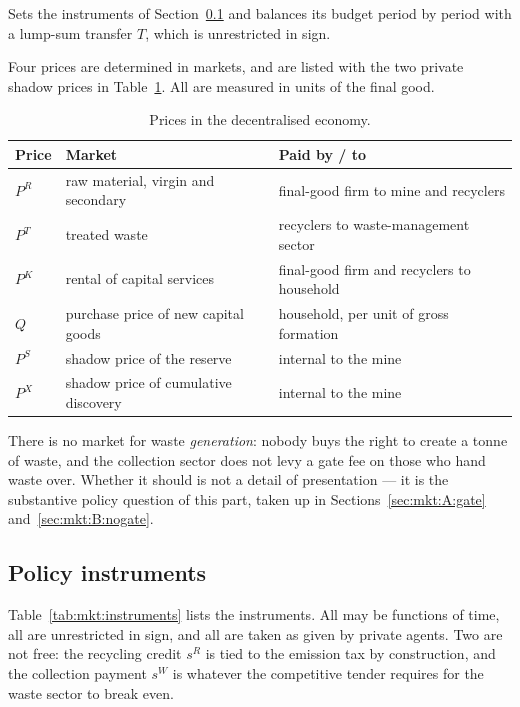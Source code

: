  Sets the instruments of Section~\ref{sec:mkt:setup:instruments} and
balances its budget period by period with a lump-sum transfer $T$, which is unrestricted in sign.

Four prices are determined in markets, and are listed with the two private shadow prices in
Table~\ref{tab:mkt:prices}. All are measured in units of the final good.

\begin{table}[H]
\centering
\caption{Prices in the decentralised economy.}
\label{tab:mkt:prices}
\setlength{\tabcolsep}{5pt}
\renewcommand{\arraystretch}{1.05}
\begin{tabular}{@{}p{}p{}p{}@{}}
\toprule
Price & Market & Paid by / to \\
\midrule
$P^R$ & raw material, virgin and secondary  & final-good firm to mine and recyclers \\
$P^T$ & treated waste                       & recyclers to waste-management sector \\
$P^K$ & rental of capital services          & final-good firm and recyclers to household \\
$Q$   & purchase price of new capital goods & household, per unit of gross formation \\
\midrule
$P^S$ & shadow price of the reserve         & internal to the mine \\
$P^X$ & shadow price of cumulative discovery & internal to the mine \\
\bottomrule
\end{tabular}
\end{table}

There is no market for waste \emph{generation}: nobody buys the right to create a tonne of waste, and
the collection sector does not levy a gate fee on those who hand waste over. Whether it should is not a
detail of presentation --- it is the substantive policy question of this part, taken up in
Sections~\ref{sec:mkt:A:gate} and~\ref{sec:mkt:B:nogate}.


\subsection{Policy instruments}\label{sec:mkt:setup:instruments}

Table~\ref{tab:mkt:instruments} lists the instruments. All may be functions of time, all are
unrestricted in sign, and all are taken as given by private agents. Two are not free: the recycling
credit $s^R$ is tied to the emission tax by construction, and the collection payment $s^W$ is whatever
the competitive tender requires for the waste sector to break even.

